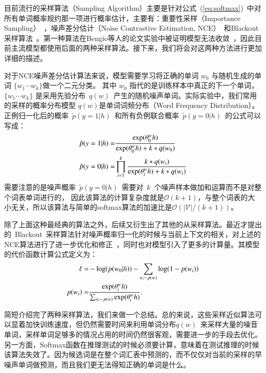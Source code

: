 目前流行的采样算法（Sampling Algorithm）主要是针对公式~(\ref{eq:softmax})~中对所有单词概率规约那一项进行概率估计，主要有：重要性采样（Importance Sampling）~，噪声差分估计（Noise Contrastive Estimation, NCE）~和Blackout 采样算法~。第一种算法在Bengio等人的论文实验中被证明模型无法收敛~，因此目前主流模型都使用后面的两种采样算法。接下来，我们将会对这两种方法进行更加详细的描述。

对于NCE噪声差分估计算法来说，模型需要学习将正确的单词 $w_0$ 与随机生成的单词 $\{w_1\cdots w_k\}$做一个二元分类。 其中 $w_0$ 指代的是训练样本中真正的下一个单词， $\{w_1\cdots w_k\}$ 是采用先验分布~$q(w)$~产生的随机噪声单词。实际实验中，我们常用的采样的概率分布模型 $q(w)$是单词词频分布（Word Frequency Distribution）。 正例归一化后的概率~$\tilde{p}(y=1|h)$~和所有负例联合概率~$\tilde{p}(y=0|h)$~的公式可以写成：
\begin{equation}\label{equ:nce}
\setlength{\abovedisplayskip}{6pt}
\setlength{\belowdisplayskip}{6pt}
\begin{split}
  \tilde{p}(y=1|h)=&\frac{\exp( \theta^w_0 h)}{ \exp( \theta^w_0 h)+k *q(w_0)}\\
  \tilde{p}(y=0|h)=&\prod_{i=1}^{k}\frac{k *q(w_i)}{\exp( \theta^w_i h)+k *q(w_i)}\\
\end{split}
\end{equation}
需要注意的是噪声概率~$\tilde{p}(y=0|h)$~需要对~$k$~个噪声样本做加和运算而不是对整个词表单词进行的， 因此该算法的计算复杂度就是$\mathcal{O}(k+1)$，与整个词表的大小无关，所以该算法与简单的softmax算法的加速比是$\mathcal{O}(\mathcal{|V|}/(k+1))$。

除了上面这种最经典的算法之外，后续又衍生出了其他的从采样算法。最近才提出的~Blackout~采样算法针对噪声概率归一化的时候与当前上下文的相关，对上述的NCE算法进行了进一步优化和修正~，同时也对模型引入了更多的计算量。其模型的代价函数计算公式定义为：
\begin{equation}
\setlength{\abovedisplayskip}{6pt}
\setlength{\belowdisplayskip}{6pt}
\begin{split}
  \ell=&-\log(p(w_0|h)) - \sum_{w_i \sim p(w)} \log(1 - p(w_i))\\
p(w_i) =& \frac{\exp(\theta^w_i h)}{\sum_{w_i \sim p(w)} \exp(\theta^w_i h)}.
\end{split}
\end{equation}

简短介绍完了两种采样算法，我们来做一个总结。总的来说，这些采样近似算法可以显着加快训练速度，但仍然需要时间来利用单词分布$q(w)$~来采样大量的噪音单词，采样单词足够多的情况占用的时间仍然很客观，需要进一步的手段去优化。 另一方面，Softmax函数在推理测试的时候必须要计算，意味着在测试推理的时候该算法失效了。因为候选词是在整个词汇表中预测的，而不仅仅对当前的采样的早噪声单词做预测，而且我们更无法得知正确的单词是什么。

